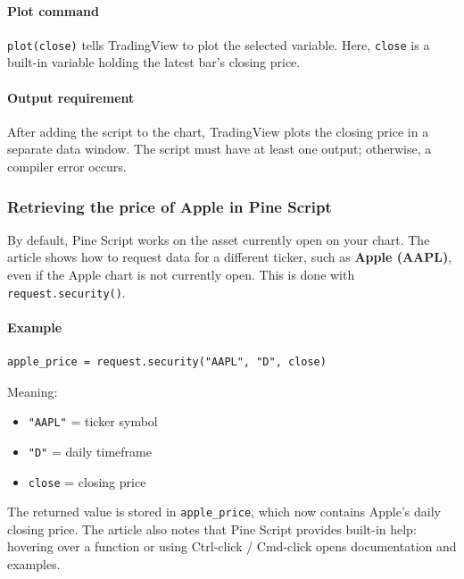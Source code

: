 \documentclass[12pt,openany]{book}
\begin{document}
\paragraph{Plot command}

\texttt{plot(close)} tells TradingView to plot the selected variable. Here, \texttt{close} is a built-in variable holding the latest bar's closing price.

\paragraph{Output requirement}

After adding the script to the chart, TradingView plots the closing price in a separate data window. The script must have at least one output; otherwise, a compiler error occurs.

\subsubsection{Retrieving the price of Apple in Pine Script}

By default, Pine Script works on the asset currently open on your chart. The article shows how to request data for a different ticker, such as \textbf{Apple (AAPL)}, even if the Apple chart is not currently open. This is done with \texttt{request.security()}.

\paragraph{Example}

\begin{Verbatim}[breaklines=true,breakanywhere=true,fontsize=\small]
apple_price = request.security("AAPL", "D", close)
\end{Verbatim}

Meaning:

\begin{itemize}[leftmargin=*]
    \item \texttt{"AAPL"} = ticker symbol
    \item \texttt{"D"} = daily timeframe
    \item \texttt{close} = closing price
\end{itemize}

The returned value is stored in \texttt{apple\_price}, which now contains Apple's daily closing price. The article also notes that Pine Script provides built-in help: hovering over a function or using Ctrl-click / Cmd-click opens documentation and examples.
\end{document}
